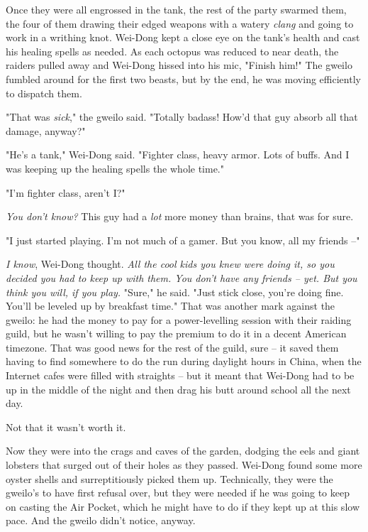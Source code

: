 Once they were all engrossed in the tank, the rest of the party
swarmed them, the four of them drawing their edged weapons with a
watery \emph{clang} and going to work in a writhing knot. Wei-Dong
kept a close eye on the tank's health and cast his healing spells
as needed. As each octopus was reduced to near death, the raiders
pulled away and Wei-Dong hissed into his mic, "Finish him!" The
gweilo fumbled around for the first two beasts, but by the end, he
was moving efficiently to dispatch them.

"That was \emph{sick}," the gweilo said. "Totally badass! How'd
that guy absorb all that damage, anyway?"

"He's a tank," Wei-Dong said. "Fighter class, heavy armor. Lots of
buffs. And I was keeping up the healing spells the whole time."

"I'm fighter class, aren't I?"

\emph{You don't know?} This guy had a \emph{lot} more money than
brains, that was for sure.

"I just started playing. I'm not much of a gamer. But you know, all
my friends --"

\emph{I know}, Wei-Dong thought.
\emph{All the cool kids you knew were doing it, so you decided you had to keep up with them. You don't have any friends -- yet. But you think you will, if you play.}
"Sure," he said. "Just stick close, you're doing fine. You'll be
leveled up by breakfast time." That was another mark against the
gweilo: he had the money to pay for a power-levelling session with
their raiding guild, but he wasn't willing to pay the premium to do
it in a decent American timezone. That was good news for the rest
of the guild, sure -- it saved them having to find somewhere to do
the run during daylight hours in China, when the Internet cafes
were filled with straights -- but it meant that Wei-Dong had to be
up in the middle of the night and then drag his butt around school
all the next day.

Not that it wasn't worth it.

Now they were into the crags and caves of the garden, dodging the
eels and giant lobsters that surged out of their holes as they
passed. Wei-Dong found some more oyster shells and surreptitiously
picked them up. Technically, they were the gweilo's to have first
refusal over, but they were needed if he was going to keep on
casting the Air Pocket, which he might have to do if they kept up
at this slow pace. And the gweilo didn't notice, anyway.

